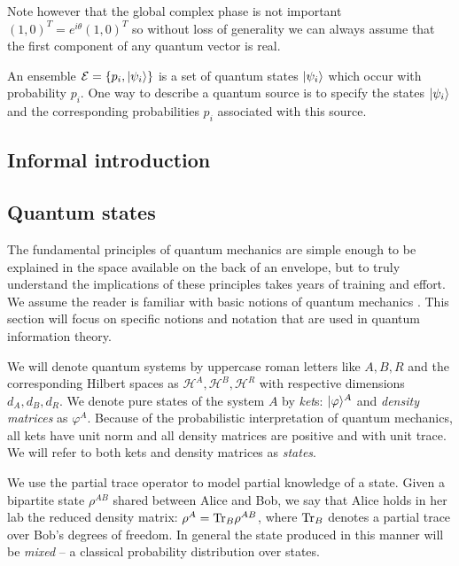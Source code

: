 \documentclass[aps,11pt,twoside,letterpaper]{article}
\def\Tr{\textup{Tr}}
\def\ph{\varphi}
\def\E{\mathcal{E}}
\def\cH{\mathcal{H}}
\begin{document}
        Note however that the global complex phase is not important $(1,0)^T= e^{i\theta}(1,0)^T$ so without loss
        of generality we can always assume that the first component of any quantum vector is real.


        An ensemble $\E=\{p_i, \ket{\psi_i} \}$ is a set of quantum states $| \psi_i \rangle$ which occur with 
        probability $p_i$. 
        One way to describe a quantum source is to specify the states $| \psi_i \rangle$ and the
        corresponding probabilities $p_i$ associated with this source. 


    \subsection{Informal introduction}

		

		\bigskip
		\subsection{Quantum states}
			
			The fundamental principles of quantum mechanics are simple enough to be explained in the space
			available on the back of an envelope, but to truly understand the implications of these
			principles takes years of training and effort.
			We assume the reader is familiar with basic notions of quantum mechanics \cite{sakurai,NC04}. 
			This section will focus on specific notions and notation that are used in quantum information theory.
			
			We will denote quantum systems by uppercase roman letters like $A,B,R$ and the corresponding 
			Hilbert spaces as $\cH^A, \cH^B, \cH^R$ with respective dimensions $d_A,d_B,d_R$.
		    We denote pure states of the system $A$ by \emph{ket}s: $\ket{\ph}^A$
		    and \emph{density matrices} as $\ph^A$.		%
			Because of the probabilistic interpretation of quantum mechanics, all kets have unit norm and all
			density matrices are positive and with unit trace.
		    We will refer to both kets and density matrices as \emph{states}.
		    
			We use the partial trace operator to model partial knowledge of a state.
			Given a bipartite state $\rho^{AB}$ shared between Alice and Bob, we say that Alice holds in her lab
			the reduced density matrix: $\rho^A = \Tr_B\rho^{AB}$, where $\Tr_B$ denotes a partial trace over 
			Bob's degrees of freedom.
			In general the state produced in this manner will be \emph{mixed} -- a classical probability distribution
			over states.
			
\end{document}
